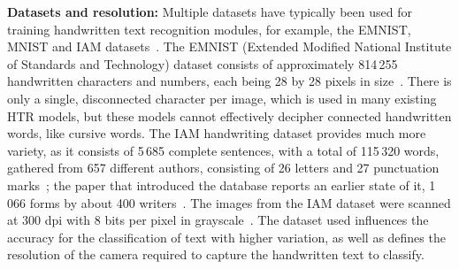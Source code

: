 \textbf{Datasets and resolution:} Multiple datasets have typically been used for training handwritten text recognition modules, for example, the EMNIST, MNIST and IAM datasets~\cite[p.~2]{mamun2024}. The EMNIST (Extended Modified National Institute of Standards and Technology) dataset consists of approximately 814\,255 handwritten characters and numbers, each being 28 by 28 pixels in size~\cite[p.~40]{chen2023}. There is only a single, disconnected character per image, which is used in many existing HTR models, but these models cannot effectively decipher connected handwritten words, like cursive words. The IAM handwriting dataset provides much more variety, as it consists of 5\,685 complete sentences, with a total of 115\,320 words, gathered from 657 different authors, consisting of 26 letters and 27 punctuation marks~\cite{iamdb}; the paper that introduced the database reports an earlier state of it, 1\,066 forms by about 400 writers~\cite[p.~39]{marti2002}. The images from the IAM dataset were scanned at 300 dpi with 8 bits per pixel in grayscale~\cite{iamdb}. The dataset used influences the accuracy for the classification of text with higher variation, as well as defines the resolution of the camera required to capture the handwritten text to classify. 

